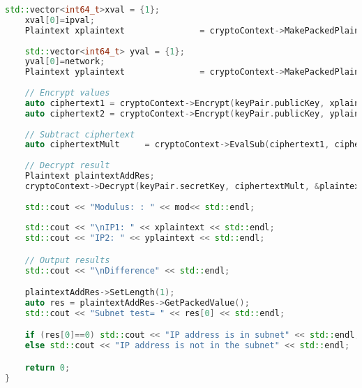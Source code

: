 \documentclass[envcountsame,runningheads,notitlepage]{llncs}
\begin{document}
\begin{lstlisting}[linewidth=\columnwidth,breaklines=true,language=C++]
    std::vector<int64_t>xval = {1};
	xval[0]=ipval;
    Plaintext xplaintext               = cryptoContext->MakePackedPlaintext(xval);
 
    std::vector<int64_t> yval = {1};
	yval[0]=network;
    Plaintext yplaintext               = cryptoContext->MakePackedPlaintext(yval);
 
    // Encrypt values
    auto ciphertext1 = cryptoContext->Encrypt(keyPair.publicKey, xplaintext);
    auto ciphertext2 = cryptoContext->Encrypt(keyPair.publicKey, yplaintext);
 
    // Subtract ciphertext
    auto ciphertextMult     = cryptoContext->EvalSub(ciphertext1, ciphertext2);
 
    // Decrypt result 
    Plaintext plaintextAddRes;
    cryptoContext->Decrypt(keyPair.secretKey, ciphertextMult, &plaintextAddRes);
 
    std::cout << "Modulus: : " << mod<< std::endl;
 
    std::cout << "\nIP1: " << xplaintext << std::endl;
    std::cout << "IP2: " << yplaintext << std::endl;

    // Output results
    std::cout << "\nDifference" << std::endl;

    plaintextAddRes->SetLength(1);
    auto res = plaintextAddRes->GetPackedValue();
    std::cout << "Subnet test= " << res[0] << std::endl;

    if (res[0]==0) std::cout << "IP address is in subnet" << std::endl;
    else std::cout << "IP address is not in the subnet" << std::endl;

    return 0;
}
\end{lstlisting}




\end{document}
